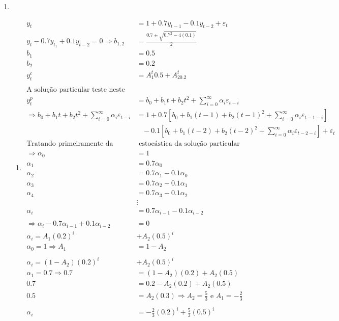 \begin{enumerate}
\begin{enumerate}
\end{enumerate}

	------------------------------------

\item %

\begin{enumerate}
	\item %
	
	\begin{align*}
		 y_t &= 1 + 0.7y_{t-1} - 0.1y_{t-2} + \varepsilon_t\\
		y_t -0.7y_{t_1} + 0.1y_{t-2} =0 \Rightarrow b_{1,2}&=\frac{0.7\pm \sqrt{0.7^2-4(0.1)}}{2}\\
		 b_1&=0.5\\
		 b_2&=0.2\\
		 y_t^c&=A_1^t0.5+A_20.2^t\\
		 \\
		\text{A solução particular teste neste caso é}\\
		 y_t^p&=b_0+b_1t+b_2t^2+\sum\limits_{i=0}^{\infty}\alpha_i\varepsilon_{t-i}\\
		 \Rightarrow b_0+b_1t+b_2t^2+\sum\limits_{i=0}^{\infty}\alpha_i\varepsilon_{t-i}&=1+0.7[b_0+b_1(t-1)+b_2(t-1)^2+\sum\limits_{i=0}^{\infty}\alpha_i\varepsilon_{t-1-i}]\\
		 &\;\;\;-0.1[b_0+b_1(t-2)+b_2(t-2)^2+\sum\limits_{i=0}^{\infty}\alpha_i\varepsilon_{t-2-i}]+\varepsilon_t\\
		 \text{Tratando primeiramente da parte}&\text{ estocástica da solução particular}\\
		 \Rightarrow \alpha_0&=1\\
				 \alpha_1&=0.7\alpha_0\\
				 \alpha_2&=0.7\alpha_1-0.1\alpha_0\\
				 \alpha_3&=0.7\alpha_2-0.1\alpha_1\\
				 \alpha_4&=0.7\alpha_3-0.1\alpha_2\\
				 &\vdots\\
				 \alpha_i&=0.7\alpha_{i-1}-0.1\alpha_{i-2}\\
				 \\
				 \Rightarrow  \alpha_i-0.7\alpha_{i-1}+0.1\alpha_{i-2}&=0\\
				 \alpha_i=A_1(0.2)^i&+A_2(0.5)^i\\
				 \alpha_0=1 \Rightarrow A_1&=1-A_2\\
				 \\
				  \alpha_i=(1-A_2)(0.2)^i&+A_2(0.5)^i\\
				 \alpha_1=0.7\Rightarrow 0.7&=(1-A_2)(0.2)+A_2(0.5)\\
				 0.7&=0.2-A_2(0.2)+A_2(0.5)\\
				 0.5&=A_2(0.3)\Rightarrow A_2=\frac{5}{3} \text{ e } A_1=-\frac{2}{3}\\
				 \\
				 \alpha_i&=-\frac{2}{3}(0.2)^i+\frac{5}{3}(0.5)^i
	\end{align*}
	

\end{enumerate}
\end{enumerate}
